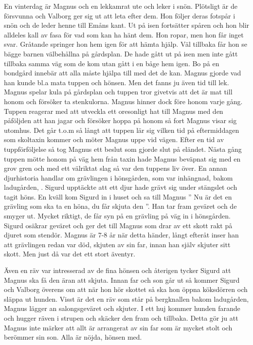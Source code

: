 En vinterdag är Magnus och en lekkamrat ute och leker i snön. Plötsligt är de försvunna och Valborg ger sig ut att leta efter dem. Hon följer deras fotspår i snön och de leder henne till Emåns kant. Ut på isen fortsätter spåren och hon blir alldeles kall av fasa för vad som kan ha hänt dem. Hon ropar, men hon får inget svar. Gråtande springer hon hem igen för att hämta hjälp. Väl tillbaka får hon se bägge barnen välbehållna på gårdsplan. De hade gått ut på isen men inte gått tillbaka samma väg som de kom utan gått i en båge hem igen.
Bo på en bondgård innebär att alla måste hjälpa till med det de kan. Magnus gjorde vad han kunde bl.a mata tuppen och hönsen. Men det fanns ju även tid till lek. Magnus spelar kula på gårdsplan och tuppen tror givetvis att det är mat till honom och försöker ta stenkulorna. Magnus hinner dock före honom varje gång. Tuppen reagerar med att utveckla ett oresonligt hat till Magnus med den påföljden att han jagar och försöker hoppa på honom så fort Magnus visar sig utomhus. Det går t.o.m så långt att tuppen lär sig vilken tid på eftermiddagen som skoltaxin kommer och möter Magnus uppe vid vägen. Efter en tid av tuppförföljelse så tog Magnus ett beslut som gjorde slut på eländet. Nästa gång tuppen mötte honom på väg hem från taxin hade Magnus beväpnat sig med en grov gren och med ett välriktat slag så var den tuppens liv över. En annan djurhistoria handlar om grävlingen i hönsgården, som var inhängnad, bakom ladugården, . Sigurd upptäckte att ett djur hade grävt sig under stängslet och tagit höns. En kväll kom Sigurd in i huset och sa till Magnus ” Nu är det en grävling som ska ta en höna, du får skjuta den ”. Han tar fram geväret och de smyger ut. Mycket riktigt, de får syn på en grävling på väg in i hönsgården. Sigurd osäkrar geväret och ger det till Magnus som drar av ett skott rakt på djuret som stendör. Magnus är 7-8 år när detta händer, långt efteråt inser han att grävlingen redan var död, skjuten av sin far, innan han själv skjuter sitt skott. Men just då var det ett stort äventyr.

Även en räv var intresserad av de fina hönsen och återigen tycker Sigurd att Magnus ska få den äran att skjuta. Innan far och son går ut så kommer Sigurd och Valborg överens om att när hon hör skottet så ska hon öppna köksdörren och släppa ut hunden. Visst är det en räv som står på bergknallen bakom ladugården, Magnus lägger an salongsgeväret och skjuter. I ett huj kommer hunden farande och hugger räven i strupen och skäcker den fram och tillbaka. Detta gör ju att Magnus inte märker att allt är arrangerat av sin far som är mycket stolt och berömmer sin son. Alla är nöjda, hönsen med.

